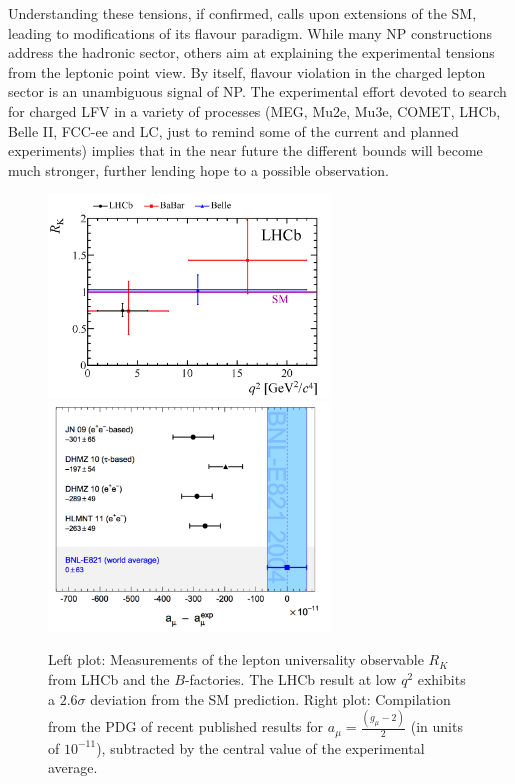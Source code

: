 Understanding these tensions, if confirmed, calls upon extensions of the SM, 
leading to modifications of its flavour paradigm. While many NP 
constructions address the hadronic sector, others aim at explaining 
the experimental tensions
from the leptonic point view. 
By itself, flavour violation in the charged lepton sector is an 
unambiguous signal of NP. The experimental effort
devoted to search for charged LFV in a variety of processes 
(MEG, Mu2e, Mu3e, COMET, LHCb, Belle II, FCC-ee and LC, just  to remind some of the current and planned experiments)
implies that in the near future the 
different bounds will become much stronger, further lending hope to a
possible observation. 
%
\begin{figure}[!b]
\includegraphics[width=7.5cm]{RK.pdf}
\includegraphics[width=7.5cm]{gminus2.pdf}
\caption{Left plot: Measurements of the lepton universality observable $R_K$ from LHCb and the $B$-factories. The LHCb result at low $q^2$ exhibits a $2.6\sigma$ deviation from the SM prediction. Right plot:  Compilation from the PDG of recent published results
for $a_{\mu} = \frac{(g_{\mu}-2)}{2}$ 
(in units of $10^{-11}$), 
subtracted by the central value
of the 
experimental
 average.
 }
 \label{quarklep}
 \end{figure}
% 


